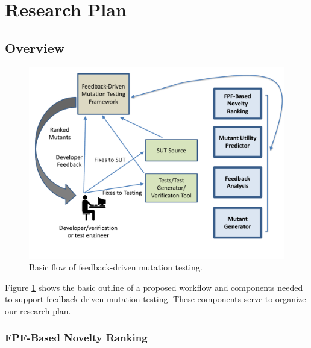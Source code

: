 \section{Research Plan}

\subsection{Overview}

\begin{figure}[t]
\centering
\includegraphics[width=0.8\columnwidth]{TestFlow}

\caption{Basic flow of feedback-driven mutation testing.}
\label{fig:flow}
\end{figure}

Figure \ref{fig:flow} shows the basic outline of a proposed workflow
and components needed to support feedback-driven mutation testing.
These components serve to organize our research plan.


\subsubsection{FPF-Based Novelty Ranking}
\label{sec:fpfplan}

